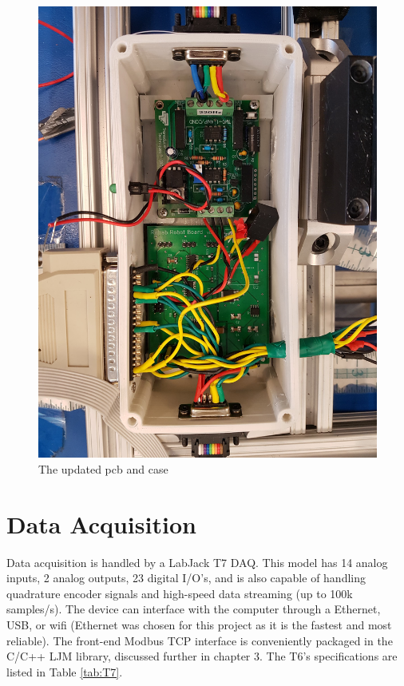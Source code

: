 \documentclass[12pt]{report}
\begin{document}
	
		\begin{figure}[h] 
		\centering
		\includegraphics[width=0.75\linewidth]{pcb_case}
		\caption{ The updated pcb and case}
		\label{fig:proto}
	\end{figure}
	

	
	\section{Data Acquisition} 

	Data acquisition is handled by a LabJack T7 DAQ. This model has 14 analog inputs, 2 analog outputs, 23 digital I/O's, and is also capable of handling quadrature encoder signals and high-speed data streaming (up to 100k samples/s). The device can interface with the computer through a Ethernet, USB, or wifi (Ethernet was chosen for this project as it is the fastest and most reliable). The front-end Modbus TCP interface is conveniently packaged in the C/C++ LJM library, discussed further in chapter 3. The T6's specifications are listed in Table \ref{tab:T7}.
	
\end{document}
